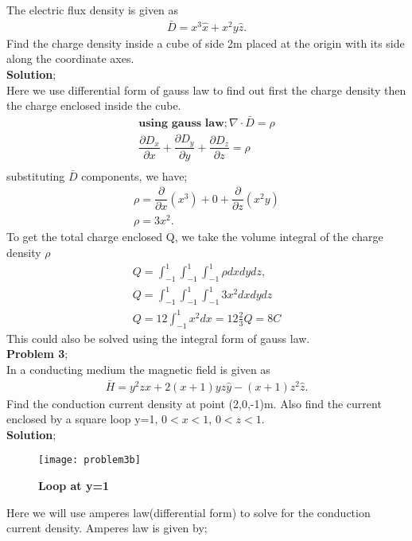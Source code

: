  The electric flux density is given as
 \begin{align*}
 \bar{D}=x^{3}\hat{x} + x^{2}y\hat{z}.
 \end{align*}
 Find the charge density inside a cube of side 2m placed at the origin with its side along the coordinate axes.\\
 \textbf{Solution};\\
 Here we use differential form of gauss law to find out first the charge density then the charge enclosed inside the cube.\\
 \begin{align*}
 \textbf{using gauss law}; \nabla\cdot\bar{D}=\rho\\
 \dfrac{\partial D_{x}}{\partial x}+\dfrac{\partial D_{y}}{\partial y}+\dfrac{\partial 
 D_{z}}{\partial z}=\rho \\
 \end{align*}
 substituting $\bar{D}$ components, we have;
 \begin{align*}
 \rho= \dfrac{\partial}{\partial x}(x^{3})+ 0 +\dfrac{\partial }{\partial z}(x^{2}y)\\
 \rho=3x^{2} .
 \end{align*}
 To get the total charge enclosed Q, we take the volume integral of the charge density $\rho$
 \begin{align*}
 Q=\int_{-1}^{1}\int_{-1}^{1}\int_{-1}^{1}\rho dxdydz, \\
 Q=\int_{-1}^{1}\int_{-1}^{1}\int_{-1}^{1}3x^{2}dxdydz \\
 Q=12\int_{-1}^{1}x^{2}dx= 12\frac{2}{3}
 Q= 8 C
  \end{align*}
 This could also be solved using the integral form of gauss law.\\
 \textbf{Problem 3};\\
  In a conducting medium the magnetic field is given as
  \begin{align*}
  \bar{H}=y^{2}z\hat{x}+2(x+1)yz\hat{y}-(x+1)z^{2}\hat{z}.
  \end{align*}
  Find the conduction current density at point (2,0,-1)m. Also find the current enclosed by a square loop y=1,  $0<x<1$, $0<z<1$.\\
   \textbf{Solution};\\
   \begin{figure}[h]
   	\centering
   	\texttt{[image: problem3b]}
   	\caption{\textbf{Loop at y=1}}
   \end{figure} 
   Here we will use amperes law(differential form) to solve for the conduction current density. Amperes law is given by;
